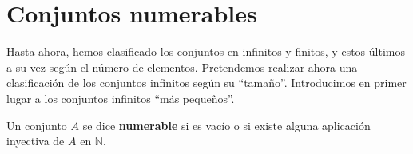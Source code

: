 
\section{Conjuntos numerables}
Hasta ahora, hemos clasificado los conjuntos en infinitos y finitos, y estos últimos a su vez según el número de elementos. Pretendemos realizar ahora una clasificación de los conjuntos infinitos según su ``tamaño''. Introducimos en primer lugar a los conjuntos infinitos ``más pequeños''.

\begin{definicion}
    Un conjunto $A$ se dice \textbf{numerable} si es vacío o si existe alguna aplicación inyectiva de $A$ en $\mathbb{N}$.
\end{definicion}

